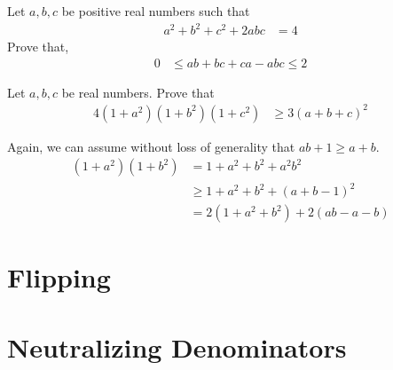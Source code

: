 \documentclass[inequalities.tex]{subfile}
\begin{document}
		\begin{problem}
			Let $a,b,c$ be positive real numbers such that
				\begin{align*}
					a^{2}+b^{2}+c^{2}+2abc
						& = 4
				\end{align*}
			Prove that,
				\begin{align*}
					0
						& \leq ab+bc+ca-abc\leq 2
				\end{align*}
			
				\begin{solution}
					
				\end{solution}
		\end{problem}
	
		\begin{problem}
			Let $a,b,c$ be real numbers. Prove that
				\begin{align*}
					4(1+a^{2})(1+b^{2})(1+c^{2})
						& \geq 3(a+b+c)^{2}
				\end{align*}
			
				\begin{solution}
					Again, we can assume without loss of generality that $ab+1\geq a+b$.
						\begin{align*}
							(1+a^{2})(1+b^{2})
								& = 1+a^{2}+b^{2}+a^{2}b^{2}\\
								& \geq 1+a^{2}+b^{2}+(a+b-1)^{2}\\
								& = 2(1+a^{2}+b^{2})+2(ab-a-b)
						\end{align*}
				\end{solution}
		\end{problem}
	\section{Flipping}
	
	\section{Neutralizing Denominators}
\end{document}
